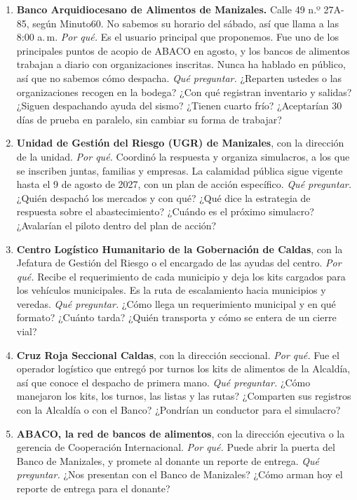 \documentclass[11pt,letterpaper,parskip=half-]{scrartcl}
\begin{document}
\begin{enumerate}[label=\textbf{\arabic*.}, ref=\arabic*, leftmargin=1.4em, itemsep=5pt]
\item\label{c:banco} \textbf{Banco Arquidiocesano de Alimentos de Manizales.} Calle 49 n.º 27A-85, según Minuto60. No sabemos su horario del sábado, así que llama a las 8:00 a.\,m.\newline
\emph{Por qué.} Es el usuario principal que proponemos. Fue uno de los principales puntos de acopio de ABACO en agosto, y los bancos de alimentos trabajan a diario con organizaciones inscritas. Nunca ha hablado en público, así que no sabemos cómo despacha.\newline
\emph{Qué preguntar.} ¿Reparten ustedes o las organizaciones recogen en la bodega? ¿Con qué registran inventario y salidas? ¿Siguen despachando ayuda del sismo? ¿Tienen cuarto frío? ¿Aceptarían 30 días de prueba en paralelo, sin cambiar su forma de trabajar?
\item \textbf{Unidad de Gestión del Riesgo (UGR) de Manizales}, con la dirección de la unidad.\newline
\emph{Por qué.} Coordinó la respuesta y organiza simulacros, a los que se inscriben juntas, familias y empresas. La calamidad pública sigue vigente hasta el 9 de agosto de 2027, con un plan de acción específico.\newline
\emph{Qué preguntar.} ¿Quién despachó los mercados y con qué? ¿Qué dice la estrategia de respuesta sobre el abastecimiento? ¿Cuándo es el próximo simulacro? ¿Avalarían el piloto dentro del plan de acción?
\item \textbf{Centro Logístico Humanitario de la Gobernación de Caldas}, con la Jefatura de Gestión del Riesgo o el encargado de las ayudas del centro.\newline
\emph{Por qué.} Recibe el requerimiento de cada municipio y deja los kits cargados para los vehículos municipales. Es la ruta de escalamiento hacia municipios y veredas.\newline
\emph{Qué preguntar.} ¿Cómo llega un requerimiento municipal y en qué formato? ¿Cuánto tarda? ¿Quién transporta y cómo se entera de un cierre vial?
\item \textbf{Cruz Roja Seccional Caldas}, con la dirección seccional.\newline
\emph{Por qué.} Fue el operador logístico que entregó por turnos los kits de alimentos de la Alcaldía, así que conoce el despacho de primera mano.\newline
\emph{Qué preguntar.} ¿Cómo manejaron los kits, los turnos, las listas y las rutas? ¿Comparten sus registros con la Alcaldía o con el Banco? ¿Pondrían un conductor para el simulacro?
\item \textbf{ABACO, la red de bancos de alimentos}, con la dirección ejecutiva o la gerencia de Cooperación Internacional.\newline
\emph{Por qué.} Puede abrir la puerta del Banco de Manizales, y promete al donante un reporte de entrega.\newline
\emph{Qué preguntar.} ¿Nos presentan con el Banco de Manizales? ¿Cómo arman hoy el reporte de entrega para el donante?
\end{enumerate}
\end{document}
